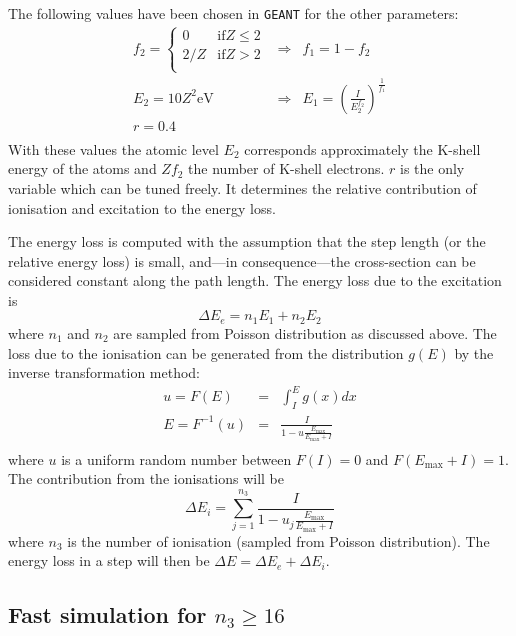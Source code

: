 \documentclass{article}
\newcommand{\Emax}{\ensuremath{E_{\mathrm{max}}}}
\newcommand{\GEANT}{\texttt{GEANT}}
\begin{document}
The following values have been chosen in \GEANT{} for the other
parameters:
\[ 
\begin{array}{lcl}
f_2 = \left\{ \begin{array}{ll}
             0   & \mathrm{if} Z \leq 2 \\
             2/Z & \mathrm{if} Z > 2 \\
             \end{array} \right.    & \Rightarrow & f_1 = 1 - f_2 \\
E_2 = 10 Z^2 \mathrm{eV}  & \Rightarrow & E_1 = \left(\frac{I}{E_{2}^{f_2}}
                                              \right)^{\frac{1}{f_1}} \\
r  = 0.4 & & \\
\end{array}
\]
With these values the atomic level $E_2$ corresponds approximately
the K-shell energy of the atoms and $Zf_2$ the number of K-shell
electrons. $r$ is the only variable which can be tuned freely. It
determines the relative contribution of ionisation and
excitation to the energy loss.

The energy loss is computed with the assumption that the step length
(or the relative energy loss) is small, and---in consequence---the
cross-section can be considered constant along the path length.  The
energy loss due to the excitation is
\begin{equation}
\Delta E_e = n_1 E_1 + n_2 E_2
\end{equation}
where $n_1$ and $n_2$ are sampled from Poisson distribution as
discussed above.  The loss due to the ionisation can be generated from
the distribution $g(E)$ by the inverse transformation method:
\begin{eqnarray}
u = F(E) &  = & \int_{I}^E g(x) dx \nonumber \\
E = F^{-1}(u) & = & \frac{I}{1 - u \frac {\Emax}{\Emax+I}} \\
\end{eqnarray}
where $u$ is a uniform random number between $F(I)=0$ and
$F(\Emax+I)=1$.  The contribution from the ionisations will be
\begin{equation}
\Delta E_i  = \sum_{j=1}^{n_3} \frac{I}
              {1 - u_j \frac {\Emax}{\Emax + I}}
\end{equation}
where $n_3$ is the number of ionisation (sampled from Poisson
distribution). The energy loss in a step will then be $\Delta E =
\Delta E_e + \Delta E_i$.


\subsection{Fast simulation for $n_3 \geq 16$}
\end{document}
